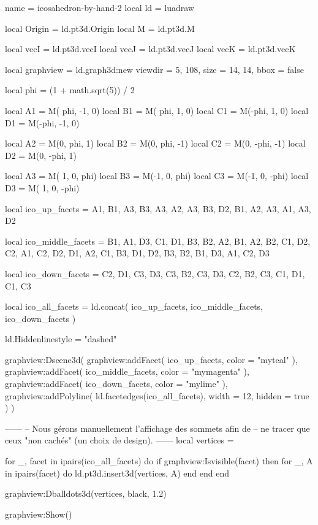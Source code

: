 \documentclass[border = 3pt]{standalone}
\begin{document}
\begin{luadraw*}{name = icosahedron-by-hand-2}
local ld = luadraw

local Origin = ld.pt3d.Origin
local M      = ld.pt3d.M

local vecI = ld.pt3d.vecI
local vecJ = ld.pt3d.vecJ
local vecK = ld.pt3d.vecK

local graphview = ld.graph3d:new{
  viewdir  = {5, 108},
  size     = {14, 14},
  bbox     = false
}

local phi = (1 + math.sqrt(5)) / 2

local A1 = M( phi, -1, 0)
local B1 = M( phi,  1, 0)
local C1 = M(-phi,  1, 0)
local D1 = M(-phi, -1, 0)

local A2 = M(0,  phi,  1)
local B2 = M(0,  phi, -1)
local C2 = M(0, -phi, -1)
local D2 = M(0, -phi,  1)

local A3 = M( 1, 0,  phi)
local B3 = M(-1, 0,  phi)
local C3 = M(-1, 0, -phi)
local D3 = M( 1, 0, -phi)

local ico_up_facets = {
  {A1, B1, A3},
  {B3, A3, A2},
  {A3, B3, D2},
  {B1, A2, A3},
  {A1, A3, D2}
}

local ico_middle_facets = {
  {B1, A1, D3},
  {C1, D1, B3},
  {B2, A2, B1},
  {A2, B2, C1},
  {D2, C2, A1},
  {C2, D2, D1},
  {A2, C1, B3},
  {D1, D2, B3},
  {B2, B1, D3},
  {A1, C2, D3}
}

local ico_down_facets = {
  {C2, D1, C3},
  {D3, C3, B2},
  {C3, D3, C2},
  {B2, C3, C1},
  {D1, C1, C3}
}

local ico_all_facets = ld.concat(
    ico_up_facets,
    ico_middle_facets,
    ico_down_facets
  )

ld.Hiddenlinestyle = "dashed"

graphview:Dscene3d(
  graphview:addFacet(
    ico_up_facets,
    {color = "myteal"}
  ),
  graphview:addFacet(
    ico_middle_facets,
    {color = "mymagenta"}
  ),
  graphview:addFacet(
    ico_down_facets,
    {color = "mylime"}
  ),
  graphview:addPolyline(
    ld.facetedges(ico_all_facets),
    {
      width  = 12,
      hidden = true
    }
  )
)

------
-- Nous gérons manuellement l'affichage des sommets afin de
-- ne tracer que ceux "non cachés" (un choix de design).
------
local vertices = {}

for _, facet in ipairs(ico_all_facets) do
  if graphview:Isvisible(facet) then
    for _, A in ipairs(facet) do
      ld.pt3d.insert3d(vertices, A)
    end
  end
end

graphview:Dballdots3d(vertices, black, 1.2)

graphview:Show()
\end{luadraw*}
\end{document}
